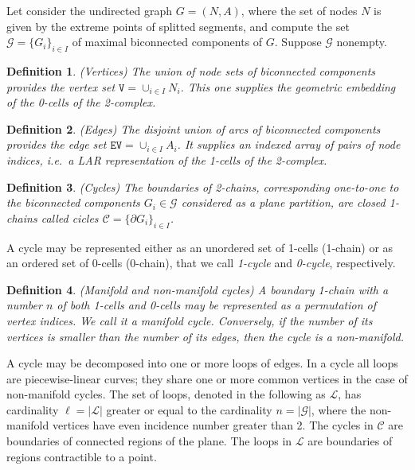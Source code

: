 \documentclass[11pt,oneside]{article}	%
\newtheorem{definition}{Definition}
\begin{document}
Let consider the undirected graph $G=(N,A)$, where the set of nodes $N$ is given by the extreme points of splitted  segments, and compute the set  $\mathcal{G} = \{G_i\}_{i\in I}$ of maximal biconnected components of $G$.    Suppose $\mathcal{G}$ nonempty.

\begin{definition}{(Vertices)}
The union of node sets of biconnected components provides the \emph{vertex} set $\texttt{V} = \cup_{i\in I} N_i$.
This one supplies the geometric embedding of the 0-cells of the 2-complex.
\end{definition}

\begin{definition}{(Edges)}
The disjoint union of arcs of biconnected components provides the \emph{edge set} $\texttt{EV} = \cup_{i\in I} A_i$.
It supplies an indexed array of pairs of node indices, i.e.~a LAR representation of the 1-cells of the 2-complex.
\end{definition}


\begin{definition}{(Cycles)}
The \emph{boundaries} of 2-chains, corresponding one-to-one to the biconnected components $G_i \in \mathcal{G}$ considered as a plane partition, are \emph{closed} 1-chains called \emph{cicles} $\mathcal{C} = \{\partial G_i\}_{i\in I}$.
\end{definition}

A cycle may be represented either as an unordered set of 1-cells (1-chain) or as an ordered set of 0-cells (0-chain), that we call \emph{1-cycle} and \emph{0-cycle}, respectively.

\begin{definition}{(Manifold and non-manifold cycles)}
A boundary 1-chain with a number $n$ of both 1-cells and 0-cells may be represented as a permutation of vertex indices. We call it a \emph{manifold cycle}.  Conversely, if the number of its vertices is smaller than the number of its edges, then the cycle is a \emph{non-manifold}.
\end{definition}

A cycle may be decomposed into one or more loops of edges. In a cycle all loops are piecewise-linear curves; they share one or more common vertices in the case of non-manifold cycles. The set of loops, denoted in the following as $\mathcal{L}$, has cardinality $\ell = |\mathcal{L}|$ greater or equal to the cardinality $n = |\mathcal{G}|$, where the non-manifold vertices have even incidence number greater than 2.
The cycles in $\mathcal{C}$ are boundaries of connected regions of the plane. The loops in $\mathcal{L}$ are boundaries of regions contractible to a point. 
\end{document}
